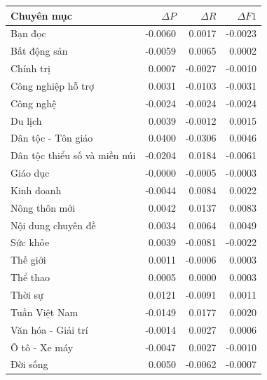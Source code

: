 \begin{tabularx}{\linewidth}{>{\raggedright\arraybackslash}Xrrr}
\toprule
Chuyên mục & $\Delta P$ & $\Delta R$ & $\Delta F1$\\\midrule
Bạn đọc & -0.0060 & 0.0017 & -0.0023\\
Bất động sản & -0.0059 & 0.0065 & 0.0002\\
Chính trị & 0.0007 & -0.0027 & -0.0010\\
Công nghiệp hỗ trợ & 0.0031 & -0.0103 & -0.0031\\
Công nghệ & -0.0024 & -0.0024 & -0.0024\\
Du lịch & 0.0039 & -0.0012 & 0.0015\\
Dân tộc - Tôn giáo & 0.0400 & -0.0306 & 0.0046\\
Dân tộc thiểu số và miền núi & -0.0204 & 0.0184 & -0.0061\\
Giáo dục & -0.0000 & -0.0005 & -0.0003\\
Kinh doanh & -0.0044 & 0.0084 & 0.0022\\
Nông thôn mới & 0.0042 & 0.0137 & 0.0083\\
Nội dung chuyên đề & 0.0034 & 0.0064 & 0.0049\\
Sức khỏe & 0.0039 & -0.0081 & -0.0022\\
Thế giới & 0.0011 & -0.0006 & 0.0003\\
Thể thao & 0.0005 & 0.0000 & 0.0003\\
Thời sự & 0.0121 & -0.0091 & 0.0011\\
Tuần Việt Nam & -0.0149 & 0.0177 & 0.0020\\
Văn hóa - Giải trí & -0.0014 & 0.0027 & 0.0006\\
Ô tô - Xe máy & -0.0047 & 0.0027 & -0.0010\\
Đời sống & 0.0050 & -0.0062 & -0.0007\\
\bottomrule\end{tabularx}

